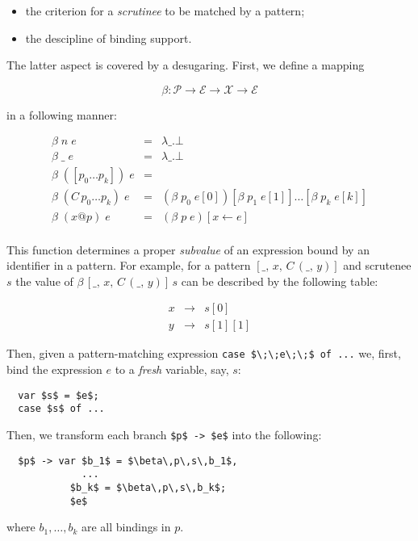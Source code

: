 \documentclass{article}
\newcommand{\llang}[1]{\mbox{\lstinline[mathescape]|#1|}}
\theoremstyle{definition}
\begin{document}
\begin{itemize}
\item the criterion for a \emph{scrutinee} to be matched by a pattern;
\item the descipline of binding support.
\end{itemize}

The latter aspect is covered by a desugaring. First, we define a mapping

\[
\beta : \mathscr P \to \mathscr E \to \mathscr X \to \mathscr E
\]

in a following manner:

\[
\begin{array}{rcl}
  \beta\;n\;e & = & \lambda \_ . \bot \\
  \beta\;\_\;e & = & \lambda \_ . \bot \\
  \beta\;([p_0\dots p_k])\;e & = & \\
  \beta\;(C\,p_0\dots p_k)\;e & = & (\beta\;p_0\;e[0])[\beta\;p_1\;e[1]]\dots [\beta\;p_k\;e[k]]\\
  \beta\;(x@p)\;e & = & (\beta\;p\;e) [x \gets e]\\
\end{array}
\]

This function determines a proper \emph{subvalue} of an expression bound by an identifier in a pattern. For example,
for a pattern $[\_,\, x,\, C\, (\_,\, y)]$ and scrutenee $s$ the value of $\beta\, [\_,\, x,\, C\, (\_,\, y)]\,s$ can be described by
the following table:

\[
\begin{array}{rcl}
  x & \to & s[0]\\
  y & \to & s[1][1]
\end{array}
\]

Then, given a pattern-matching expression \llang{case $\;\;e\;\;$ of ...} we, first, bind the expression $e$ to a \emph{fresh} variable,
say, $s$:

\begin{lstlisting}
  var $s$ = $e$;
  case $s$ of ...
\end{lstlisting}

Then, we transform each branch \llang{$p$ -> $e$} into the following:

\begin{lstlisting}
  $p$ -> var $b_1$ = $\beta\,p\,s\,b_1$,
             ...
           $b_k$ = $\beta\,p\,s\,b_k$;
           $e$
\end{lstlisting}

where $b_1,\dots,b_k$ are all bindings in $p$.
\end{document}
